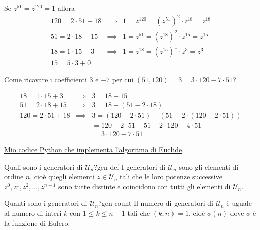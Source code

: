 \documentclass[11pt]{article}
\newcommand{\calU}{\mathcal{U}}
\begin{document}
    \begin{example}{}{}
        Se $z^{51} = z^{120} = 1$ allora
        $$\begin{array}{rcl}
            120 = 2 \cdot 51 + 18 & \implies & 1 = z^{120} = (z^{51})^2 \cdot z^{18} = z^{18} \\
            51 = 2 \cdot 18 + 15 & \implies & 1 = z^{51} = (z^{18})^2 \cdot z^{15} = z^{15} \\
            18 = 1 \cdot 15 + 3 & \implies & 1 = z^{18} = (z^{15})^1 \cdot z^{3} = z^{3} \\
            15 = 5 \cdot 3 + 0
        \end{array}$$

        Come ricavare i coefficienti $3$ e $-7$ per cui $(51, 120) = 3 = 3 \cdot 120 -7 \cdot 51$?

        $$\begin{array}{rcl}
            18 = 1 \cdot 15 + 3 & \implies & 3 = 18 - 15 \\
            51 = 2 \cdot 18 + 15 & \implies & 3 = 18 - (51 - 2 \cdot 18) \\
            120 = 2 \cdot 51 + 18 & \implies & 3 = (120 - 2 \cdot 51) - (51 - 2 \cdot (120 - 2 \cdot 51)) \\
            & & = 120 - 2 \cdot 51 -51 + 2 \cdot 120 - 4 \cdot 51 \\
            & & = 3 \cdot 120 - 7 \cdot 51
        \end{array}$$
    \end{example}

    \href{https://github.com/0-Sam-0/Cryptography-UniPR}{Mio codice Python che implementa l'algoritmo di Euclide}.

    \begin{question}
    {Quali sono i generatori di $\calU_n$?}{gen-def}
        I generatori di $\calU_n$ sono gli elementi di ordine $n$, cioè quegli elementi $z \in \calU_n$ tali che le loro potenze successive $z^0, z^1, z^2, \ldots, z^{n-1}$ sono tutte distinte e coincidono con tutti gli elementi di $\calU_n$.
    \end{question}

    \begin{question}
    {Quanti sono i generatori di $\calU_n$?}{gen-count}
        Il numero di generatori di $\calU_n$ è uguale al numero di interi $k$ con $1 \leq k \leq n-1$ tali che $(k,n) = 1$, cioè $\phi(n)$ dove $\phi$ è la funzione di Eulero.
    \end{question}
\end{document}
